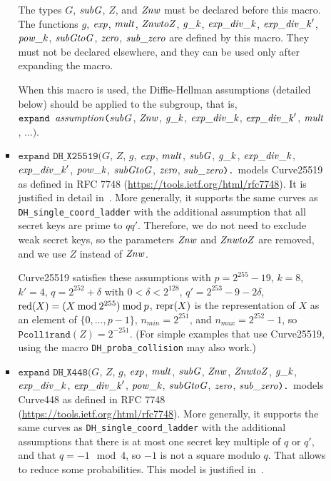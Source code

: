 \documentclass{article}
\begin{document}
\begin{itemize}
\begin{itemize}
\begin{itemize}
       The types $G$, $\mathit{subG}$, $Z$, and $\mathit{Znw}$ must be declared before this macro.  The
       functions $g$, $\mathit{exp}$, $\mathit{mult}$, $\mathit{ZnwtoZ}$, $\mathit{g\_k}$, $\mathit{exp\_div\_k}$, $\mathit{exp\_div\_k}'$, $\mathit{pow\_k}$, $\mathit{subGtoG}$,
       $\mathit{zero}$, $\mathit{sub\_zero}$ are defined by this macro. They must not be declared
       elsewhere, and they can be used only after expanding the macro.

       When this macro is used, the Diffie-Hellman assumptions (detailed below)
       should be applied to the subgroup, that is,
       $\texttt{expand\ }\vn{assumption}\texttt{(}\vn{subG}$, $\mathit{Znw}$, $\mathit{g\_k}$, $\mathit{exp\_div\_k}$, $\mathit{exp\_div\_k}'$, $\mathit{mult}$, $\dots\texttt{).}$


     \item $\texttt{expand\ DH\_X25519}(G$, $Z$, $g$, $\mathit{exp}$, $\mathit{mult}$, $\mathit{subG}$, $\mathit{g\_k}$, $\mathit{exp\_div\_k}$, $\mathit{exp\_div\_k}'$, $\mathit{pow\_k}$, $\mathit{subGtoG}$, $\mathit{zero}$, $\mathit{sub\_zero}\texttt{).}$ models Curve25519 as defined in RFC 7748 (\url{https://tools.ietf.org/html/rfc7748}). It is justified in detail in~\cite{LippBlanchetBharagavanInria19}.
   More generally, it supports the same curves as \texttt{DH\_single\_coord\_ladder}
   with the additional assumption that all secret keys are prime to $qq'$. 
   Therefore, we do not need to exclude weak secret keys, so the
   parameters $\mathit{Znw}$ and $\mathit{ZnwtoZ}$ are removed, and we use $Z$ instead of $\mathit{Znw}$.

   Curve25519 satisfies these assumptions with
   $p = 2^{255}-19$,
   $k = 8$, $k' = 4$, $q = 2^{252} + \delta$ with $0 < \delta < 2^{128}$,
      $q' = 2^{253} - 9 - 2\delta$,
    $\mathrm{red}(X) = (X \mathbin{\mathrm{mod}} 2^{255})\mathbin{\mathrm{mod}} p$, $\mathrm{repr}(X)$ is the representation 
      of $X$ as an element of $\{0, \dots, p-1\}$,
    $n_{min} = 2^{251}$, and $n_{max} = 2^{252}-1$, so $\texttt{Pcoll1rand}(Z) = 2^{-251}$.
       (For simple examples that use Curve25519, using the macro 
       \texttt{DH\_proba\_collision} may also work.)

     \item $\texttt{expand\ DH\_X448}(G$, $Z$, $g$, $\mathit{exp}$, $\mathit{mult}$, $\mathit{subG}$, $\mathit{Znw}$, $\mathit{ZnwtoZ}$, $\mathit{g\_k}$, $\mathit{exp\_div\_k}$, $\mathit{exp\_div\_k}'$, $\mathit{pow\_k}$, $\mathit{subGtoG}$, $\mathit{zero}$, $\mathit{sub\_zero}\texttt{).}$ models Curve448 as defined in RFC 7748
(\url{https://tools.ietf.org/html/rfc7748}).
   More generally, it supports the same curves as \texttt{DH\_single\_coord\_ladder}
   with the additional assumptions that there is at most one secret key
   multiple of $q$ or $q'$, and that $q = -1 \mod 4$, so $-1$ is not a 
   square modulo $q$. That allows to reduce some probabilities.
   This model is justified in~\cite{LippBlanchetBharagavanInria19}.


\end{itemize}
\end{itemize}
\end{itemize}
\end{document}

